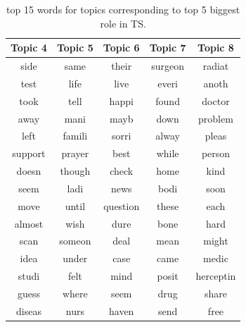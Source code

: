 \documentclass{sig-alternate}
\newcommand{\comment}[1]{\textcolor{red}{[#1]}}
\begin{document}
 
\begin{table}
\begin{center} 
\begin{tabular}{c|c|c|c|c}
Topic 4  & Topic 5 & Topic 6 & Topic 7 & Topic 8 \\\hline
side            &same   &their  &surgeon        &radiat \\\hline
test            &life   &live   &everi  &anoth\\\hline
took            &tell   &happi  &found  &doctor\\\hline
away            &mani   &mayb   &down   &problem\\\hline
left            &famili &sorri  &alway  &pleas\\\hline
support         &prayer &best   &while  &person\\\hline
doesn           &though &check  &home   &kind\\\hline
seem            &ladi   &news   &bodi   &soon\\\hline
move            &until  &question       &these  &each\\\hline
almost          &wish   &dure   &bone   &hard\\\hline
scan            &someon &deal   &mean   &might\\\hline
idea            &under  &case   &came   &medic\\\hline
studi           &felt   &mind   &posit  &herceptin\\\hline
guess           &where  &seem   &drug   &share\\\hline
diseas          &nurs   &haven  &send   &free\\\hline


\end{tabular}
\caption{top 15 words for topics corresponding to top 5 biggest role in
TS.}
\label{tab:top15WordsTS}
\end{center}
\end{table}


\end{document}
